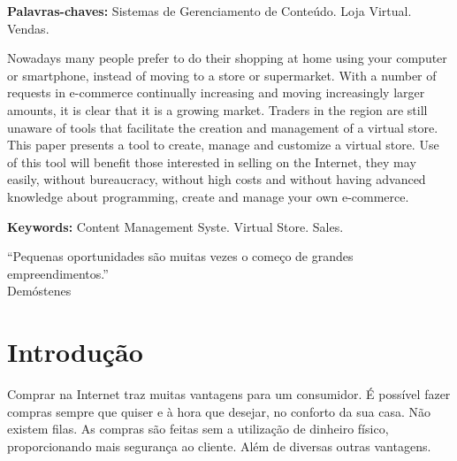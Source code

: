 \documentclass[a4paper,12pt]{monografia}
\renewcommand{\tablename}{Quadro}
\begin{document}
\noindent \textbf{Palavras-chaves:} Sistemas de Gerenciamento de Conteúdo. Loja Virtual. Vendas.

Nowadays many people prefer to do their shopping at home using your computer or smartphone, instead of moving to a store or supermarket. With a number of requests in e-commerce continually increasing and moving increasingly larger amounts, it is clear that it is a growing market. Traders in the region are still unaware of tools that facilitate the creation and management of a virtual store. This paper presents a tool to create, manage and customize a virtual store. Use of this tool will benefit those interested in selling on the Internet, they may easily, without bureaucracy, without high costs and without having advanced knowledge about programming, create and manage your own e-commerce.

\noindent \textbf{Keywords:} Content Management Syste. Virtual Store. Sales.
\newpage

\begin{epigrafe}
“Pequenas oportunidades são muitas vezes o começo de grandes empreendimentos.”\\
\hfill Demóstenes
\end{epigrafe}



{%
\let\oldnumberline\numberline%
\renewcommand{\numberline}{\figurename~\oldnumberline}%
\listoffigures%
\thispagestyle{empty}
}

\renewcommand\listtablename{Lista de Quadros}

{%
\let\oldnumberline\numberline%
\renewcommand{\numberline}{\tablename~\oldnumberline}%
\listoftables%
\thispagestyle{empty}
}

\tableofcontents
% 
\chapter{Introdução} %
\label{cha:intro}
\setcounter{page}{1}

Comprar na Internet traz muitas vantagens para um consumidor. É possível fazer compras sempre que quiser e à hora que desejar, no conforto da sua casa. Não existem filas. As compras são feitas sem a utilização de dinheiro físico, proporcionando mais segurança ao cliente.  Além de diversas outras vantagens.
\end{document}
